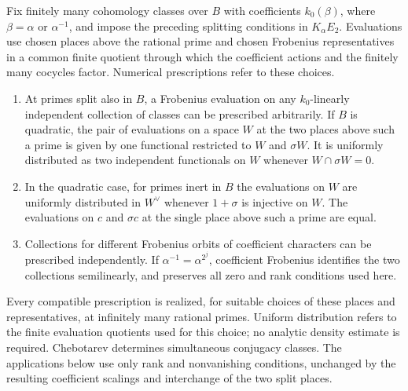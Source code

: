 \begin{lemma}\label{lem:field-evaluations}
Fix finitely many cohomology classes over $B$ with coefficients
$k_0(\beta)$, where $\beta=\alpha$ or $\alpha^{-1}$, and impose
the preceding splitting conditions in $K_\alpha E_2$.
Evaluations use chosen places above the rational prime and chosen
Frobenius representatives in a common finite quotient through which
the coefficient actions and the finitely many cocycles factor.
Numerical prescriptions refer to these choices.
\begin{enumerate}
\item At primes split also in $B$, a Frobenius evaluation on any
$k_0$-linearly independent collection of classes can be prescribed
arbitrarily.  If $B$ is quadratic, the pair of evaluations on a
space $W$ at the two places above such a prime is given by one
functional restricted to $W$ and $\sigma W$.  It is uniformly
distributed as two independent functionals on $W$ whenever
$W\cap\sigma W=0$.
\item In the quadratic case, for primes inert in $B$ the evaluations
on $W$ are uniformly distributed in $W^\vee$ whenever
$1+\sigma$ is injective on $W$.  The evaluations on $c$ and
$\sigma c$ at the single place above such a prime are equal.
\item Collections for different Frobenius orbits of coefficient
characters can be prescribed independently.  If
$\alpha^{-1}=\alpha^{2^j}$, coefficient Frobenius identifies the
two collections semilinearly, and preserves all zero and rank
conditions used here.
\end{enumerate}
Every compatible prescription is realized, for suitable choices of
these places and representatives, at infinitely many rational primes.
Uniform distribution refers to the finite evaluation quotients used
for this choice; no analytic density estimate is required.
Chebotarev determines simultaneous conjugacy classes.  The applications
below use only rank and nonvanishing conditions, unchanged by the
resulting coefficient scalings and interchange of the two split places.
\end{lemma}

